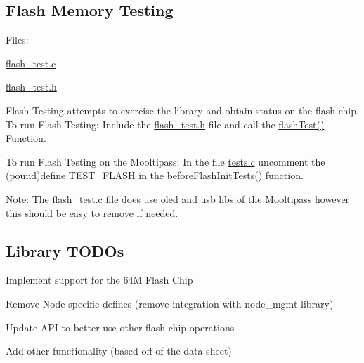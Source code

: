 \subsection*{Flash Memory Testing}

Files\+:
\begin{DoxyItemize}
\item \hyperlink{flash__test_8c}{flash\+\_\+test.\+c}
\item \hyperlink{flash__test_8h}{flash\+\_\+test.\+h}
\end{DoxyItemize}

Flash Testing attempts to exercise the library and obtain status on the flash chip. To run Flash Testing\+: Include the \hyperlink{flash__test_8h}{flash\+\_\+test.\+h} file and call the \hyperlink{flash__test_8c_abe7a11c2c89e48a5ad27d288ca17be0c}{flash\+Test()} Function.

To run Flash Testing on the Mooltipass\+: In the file \hyperlink{tests_8c}{tests.\+c} uncomment the (pound)define T\+E\+S\+T\+\_\+\+F\+L\+A\+SH in the \hyperlink{tests_8c_aff165efdc61cec87cd7b34439ccabfcb}{before\+Flash\+Init\+Tests()} function.

Note\+: The \hyperlink{flash__test_8c}{flash\+\_\+test.\+c} file does use oled and usb libs of the Mooltipass however this should be easy to remove if needed.

\subsection*{Library T\+O\+DO\textquotesingle{}s}


\begin{DoxyItemize}
\item Implement support for the 64M Flash Chip
\item Remove \textquotesingle{}Node\textquotesingle{} specific defines (remove integration with node\+\_\+mgmt library)
\item Update A\+PI to better use other flash chip operations
\item Add other functionality (based off of the data sheet) 
\end{DoxyItemize}